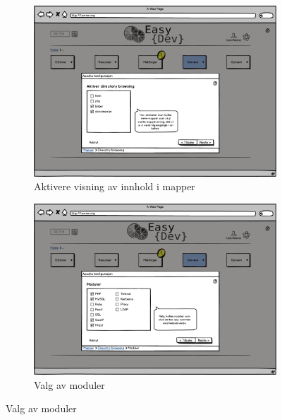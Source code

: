 \begin{figure}[p]
        \vspace{0.6cm}
        \begin{subfigure}[b]{0.48\textwidth}
                \includegraphics[width=\textwidth]
                {./img/prosessdokumentasjon/lowfi/apache3.png}
                \caption{Aktivere visning av innhold i mapper}
                \label{fig:apache3}
        \end{subfigure}
        \begin{subfigure}[b]{0.48\textwidth}
                \includegraphics[width=\textwidth]
                {./img/prosessdokumentasjon/lowfi/apache4.png}
                \caption{Valg av moduler}
                \label{fig:apache4}
        \end{subfigure}
        

\end{figure}
